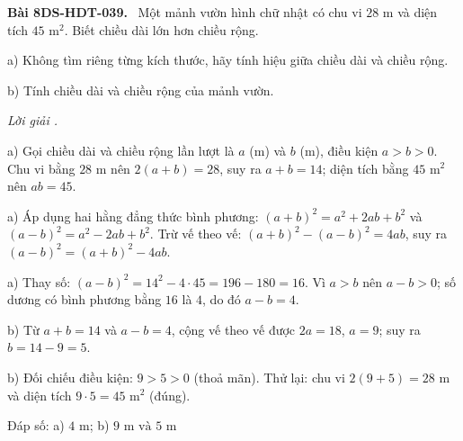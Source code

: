 \documentclass[12pt,a4paper]{article}
\newenvironment{problem}[1][]{\par\medskip\noindent\textbf{Bài #1.}\ }{\par}
\newenvironment{solution}[1][]{\par\noindent\textit{Lời giải #1.}\par}{\par}
\begin{document}
\begin{problem}[8DS-HDT-039]
Một mảnh vườn hình chữ nhật có chu vi $28$ m và diện tích $45$ m$^2$. Biết chiều dài lớn hơn chiều rộng.

a) Không tìm riêng từng kích thước, hãy tính hiệu giữa chiều dài và chiều rộng.

b) Tính chiều dài và chiều rộng của mảnh vườn.

\begin{solution}
a) Gọi chiều dài và chiều rộng lần lượt là $a$ (m) và $b$ (m), điều kiện $a > b > 0$. Chu vi bằng $28$ m nên $2(a + b) = 28$, suy ra $a + b = 14$; diện tích bằng $45$ m$^2$ nên $ab = 45$.

a) Áp dụng hai hằng đẳng thức bình phương: $(a + b)^2 = a^2 + 2ab + b^2$ và $(a - b)^2 = a^2 - 2ab + b^2$. Trừ vế theo vế: $(a + b)^2 - (a - b)^2 = 4ab$, suy ra $(a - b)^2 = (a + b)^2 - 4ab$.

a) Thay số: $(a - b)^2 = 14^2 - 4 \cdot 45 = 196 - 180 = 16$. Vì $a > b$ nên $a - b > 0$; số dương có bình phương bằng $16$ là $4$, do đó $a - b = 4$.

b) Từ $a + b = 14$ và $a - b = 4$, cộng vế theo vế được $2a = 18$, $a = 9$; suy ra $b = 14 - 9 = 5$.

b) Đối chiếu điều kiện: $9 > 5 > 0$ (thoả mãn). Thử lại: chu vi $2(9 + 5) = 28$ m và diện tích $9 \cdot 5 = 45$ m$^2$ (đúng).

Đáp số: a) $\boxed{4 \text{ m}}$; b) $\boxed{9 \text{ m và } 5 \text{ m}}$
\end{solution}
\end{problem}
\end{document}
